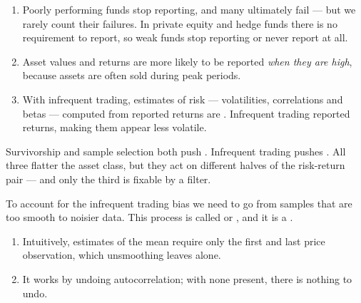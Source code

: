 
\begin{enumerate}
\item {} Poorly performing funds stop reporting, and many
ultimately fail --- but we rarely count their failures. In private equity and hedge
funds there is no requirement to report, so weak funds stop reporting or never
report at all. 
\item {} Asset values and returns are more likely to be
reported \emph{when they are high}, because assets are often sold during peak
periods. 
\item {} With infrequent trading,
estimates of risk --- volatilities, correlations and betas --- computed from
reported returns are . Infrequent trading  reported
returns, making them appear less volatile.
\end{enumerate}

\begin{imtrapbox}[breakable=false,title={Two biases inflate returns, one deflates risk}]
Survivorship and sample selection both push . Infrequent
trading pushes . All three flatter the asset class, but
they act on different halves of the risk-return pair --- and only the third is
fixable by a filter.
\end{imtrapbox}


\begin{imdefbox}[title={Unsmoothing}]
To account for the infrequent trading bias we need to go from samples that are too
smooth to noisier data. This process is called  or
, and it is a .
\end{imdefbox}

\begin{imkeybox}[title={Two properties worth memorising}]
\begin{enumerate}
\item {}
Intuitively, estimates of the mean require only the first and last price
observation, which unsmoothing leaves alone.
\item {}
It works by undoing autocorrelation; with none present, there is nothing to undo.
\end{enumerate}
\end{imkeybox}

